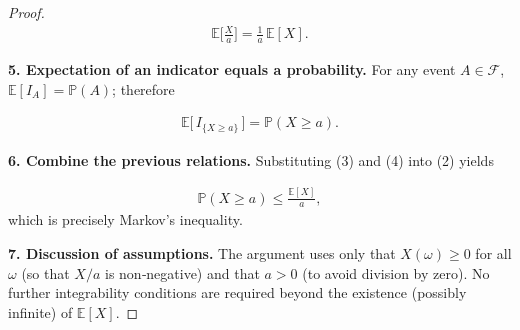 \begin{proof}
\begin{align*}
\mathbb{E}\!\bigg[\frac{X}{a}\bigg]=\frac{1}{a}\,\mathbb{E}[X].
\tag{3}
\end{align*}

\medskip
\textbf{5. Expectation of an indicator equals a probability.}  
For any event \(A\in\mathcal{F}\), \(\mathbb{E}[I_A]=\mathbb{P}(A)\); therefore

\begin{align*}
\mathbb{E}\!\big[\,I_{\{X\ge a\}}\,\big]=\mathbb{P}(X\ge a).
\tag{4}
\end{align*}

\medskip
\textbf{6. Combine the previous relations.}  
Substituting (3) and (4) into (2) yields

\begin{align*}
\mathbb{P}(X\ge a)\le\frac{\mathbb{E}[X]}{a},
\end{align*}
which is precisely Markov’s inequality.

\medskip
\textbf{7. Discussion of assumptions.}  
The argument uses only that \(X(\omega)\ge0\) for all \(\omega\) (so that
\(X/a\) is non‑negative) and that \(a>0\) (to avoid division by zero). No
further integrability conditions are required beyond the existence (possibly
infinite) of \(\mathbb{E}[X]\).

\end{proof}